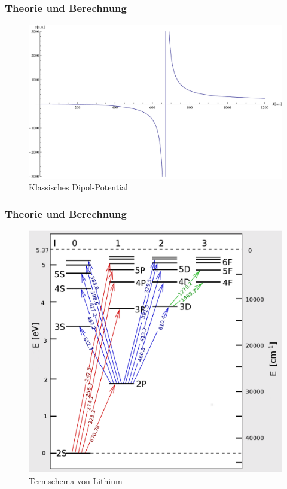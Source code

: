 \documentclass{beamer}
\begin{document}
\begin{frame}
	\frametitle{Theorie und Berechnung}
	\begin{figure}
	\centering
	\includegraphics[scale=0.4]{classicpotential}
	\caption{Klassisches Dipol-Potential}
	\end{figure}
\end{frame}
\begin{frame}
	\frametitle{Theorie und Berechnung}
\begin{center}
	\begin{figure}
                \includegraphics[scale=0.22]{levels2}
           	\caption{Termschema von Lithium}
\end{figure}
\end{center}
\end{frame}
\end{document}
